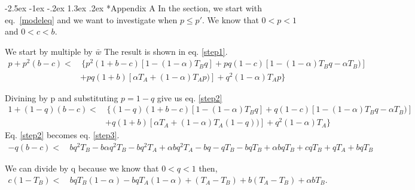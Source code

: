 \documentclass[12pt]{extarticle}
\makeatletter
\renewcommand\section{\@startsection {section}{1}{\z@}%
     {-2.5ex \@plus -1ex \@minus -.2ex}%
     {1.3ex \@plus.2ex}%
    {\Large\bfseries}}
\makeatother
\begin{document}



\newpage
\section*{Appendix A} %
In the section, we start with eq.~\eqref{modeleq} and we want to investigate when $p\leq p'$. We know that $0<p<1$ and $0<c<b$.

We start by multiple by $\bar{w}$ The result is shown in eq. \eqref{step1}.
\begin{equation} 
\begin{split} \label{step1}
p + p^2(b-c) < & \, \{ p^2(1+b-c)[1-(1-\alpha)T_Bq] + pq(1-c)[1-(1-\alpha)T_Bq-\alpha T_B)]\\
&+ pq(1+b)[\alpha T_A+(1-\alpha)T_Ap)] + q^2(1-\alpha)T_Ap\}
\end{split}
\end{equation}

Divining by p and substituting $p=1-q$ give us eq. \eqref{step2}
\begin{equation} 
\begin{split} \label{step2}
1 + (1-q)(b-c) < & \, \{ (1-q)(1+b-c)[1-(1-\alpha)T_Bq] + q(1-c)[1-(1-\alpha)T_Bq-\alpha T_B)]\\
&+ q(1+b)[\alpha T_A+(1-\alpha)T_A(1-q))] + q^2(1-\alpha)T_A\}
\end{split}
\end{equation}
Eq. \eqref{step2} becomes eq. \eqref{step3}.
\begin{equation} 
\begin{split}\label{step3}
 -q(b-c) < & \,  bq^2T_B-b\alpha q^2T_B - bq^2T_A + \alpha bq^2T_A - bq - qT_B - bqT_B + \alpha bqT_B +cqT_B + qT_A + bqT_B 
\end{split}
\end{equation}

We can divide by q because we know that $0<q<1$ then,
\begin{equation} 
\begin{split} \label{step4}
 c(1-T_B) < & \,  bqT_B(1-\alpha) - bqT_A(1-\alpha) + (T_A-T_B) + b(T_A - T_B) + \alpha bT_B.
\end{split}
\end{equation}
\end{document}
